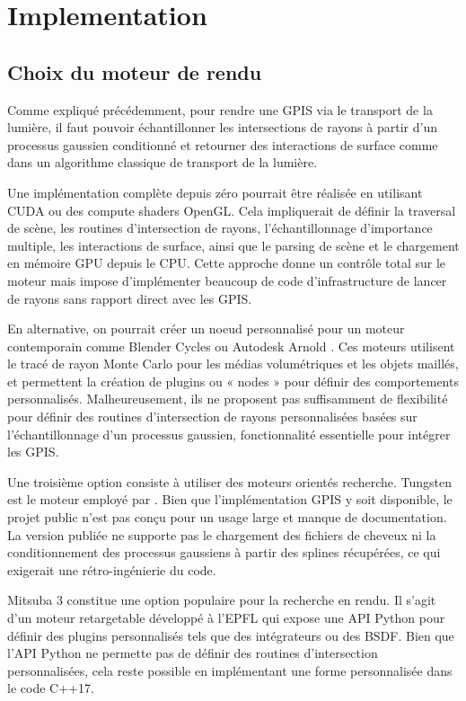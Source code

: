 \section{Implementation}

\subsection{Choix du moteur de rendu}

Comme expliqué précédemment, pour rendre une GPIS via le transport de la lumière, il faut pouvoir échantillonner les intersections de rayons à partir d'un processus gaussien conditionné et retourner des interactions de surface comme dans un algorithme classique de transport de la lumière.

Une implémentation complète depuis zéro pourrait être réalisée en utilisant CUDA ou des compute shaders OpenGL. Cela impliquerait de définir la traversal de scène, les routines d'intersection de rayons, l'échantillonnage d'importance multiple, les interactions de surface, ainsi que le parsing de scène et le chargement en mémoire GPU depuis le CPU. Cette approche donne un contrôle total sur le moteur mais impose d'implémenter beaucoup de code d'infrastructure de lancer de rayons sans rapport direct avec les GPIS.

En alternative, on pourrait créer un noeud personnalisé pour un moteur contemporain comme Blender Cycles \cite{Blender} ou Autodesk Arnold \cite{Arnold}. Ces moteurs utilisent le tracé de rayon Monte Carlo pour les médias volumétriques et les objets maillés, et permettent la création de plugins ou « nodes » pour définir des comportements personnalisés. Malheureusement, ils ne proposent pas suffisamment de flexibilité pour définir des routines d'intersection de rayons personnalisées basées sur l'échantillonnage d'un processus gaussien, fonctionnalité essentielle pour intégrer les GPIS.

Une troisième option consiste à utiliser des moteurs orientés recherche. Tungsten \cite{Tungsten} est le moteur employé par \textcite{seyb24from,xu25practical}. Bien que l'implémentation GPIS y soit disponible, le projet public n'est pas conçu pour un usage large et manque de documentation. La version publiée ne supporte pas le chargement des fichiers de cheveux ni la conditionnement des processus gaussiens à partir des splines récupérées, ce qui exigerait une rétro-ingénierie du code.

Mitsuba 3 \cite{Mitsuba3} constitue une option populaire pour la recherche en rendu. Il s'agit d'un moteur retargetable développé à l'EPFL qui expose une API Python pour définir des plugins personnalisés tels que des intégrateurs ou des BSDF. Bien que l'API Python ne permette pas de définir des routines d'intersection personnalisées, cela reste possible en implémentant une forme personnalisée dans le code C++17.

